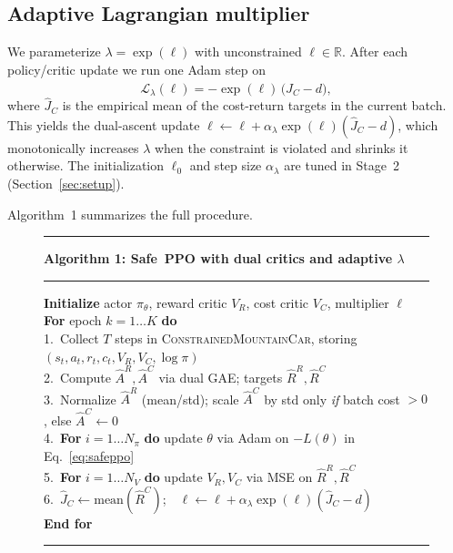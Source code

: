 \documentclass{article}
\newcommand{\eqnref}[1]{Eq.~\eqref{#1}}
\newcommand{\secref}[1]{Section~\ref{#1}}
\begin{document}
\subsection{Adaptive Lagrangian multiplier}
We parameterize $\lambda = \exp(\ell)$ with unconstrained $\ell \in \mathbb{R}$. After each
policy/critic update we run one Adam step on
\begin{equation}
\label{eq:lambdaupdate}
\mathcal{L}_\lambda(\ell) = -\exp(\ell)\,\bigl(\hat{J}_C - d\bigr),
\end{equation}
where $\hat{J}_C$ is the empirical mean of the cost-return targets in the current batch. This
yields the dual-ascent update $\ell \leftarrow \ell + \alpha_\lambda \exp(\ell)(\hat{J}_C - d)$,
which monotonically increases $\lambda$ when the constraint is violated and shrinks it otherwise.
The initialization $\ell_0$ and step size $\alpha_\lambda$ are tuned in Stage~2 (\secref{sec:setup}).

Algorithm~1 summarizes the full procedure.

\begin{figure}[H]
\centering
\begin{minipage}{0.95\linewidth}
\hrule\medskip
\textbf{Algorithm 1: Safe~PPO with dual critics and adaptive $\lambda$}
\medskip\hrule\medskip
\textbf{Initialize} actor $\pi_\theta$, reward critic $V_R$, cost critic $V_C$, multiplier $\ell$ \\[2pt]
\textbf{For} epoch $k = 1 \ldots K$ \textbf{do} \\
\hspace*{1em} 1.\ Collect $T$ steps in \textsc{ConstrainedMountainCar}, storing $(s_t, a_t, r_t, c_t, V_R, V_C, \log\pi)$ \\
\hspace*{1em} 2.\ Compute $\hat{A}^R, \hat{A}^C$ via dual GAE; targets $\hat{R}^R, \hat{R}^C$ \\
\hspace*{1em} 3.\ Normalize $\hat{A}^R$ (mean/std); scale $\hat{A}^C$ by std only \emph{if} batch cost ${>}0$, else $\hat{A}^C \gets 0$ \\
\hspace*{1em} 4.\ \textbf{For} $i = 1 \ldots N_\pi$ \textbf{do} update $\theta$ via Adam on $-L(\theta)$ in \eqnref{eq:safeppo} \\
\hspace*{1em} 5.\ \textbf{For} $i = 1 \ldots N_V$ \textbf{do} update $V_R, V_C$ via MSE on $\hat{R}^R, \hat{R}^C$ \\
\hspace*{1em} 6.\ $\hat{J}_C \gets \mathrm{mean}(\hat{R}^C)$;\ \  $\ell \gets \ell + \alpha_\lambda \exp(\ell)(\hat{J}_C - d)$ \\
\textbf{End for}
\medskip\hrule
\end{minipage}
\end{figure}
\end{document}
